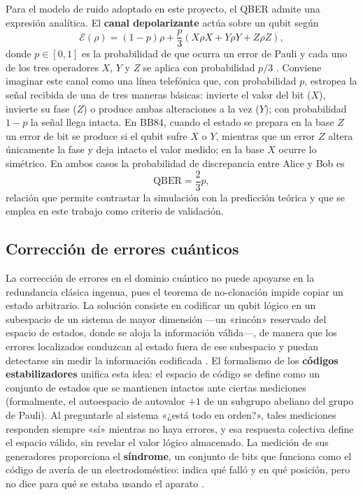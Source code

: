 \documentclass[12pt]{report}
\begin{document}
Para el modelo de ruido adoptado en este proyecto, el QBER admite una expresión
analítica. El \textbf{canal depolarizante} actúa sobre un qubit según
\begin{equation}
\mathcal{E}(\rho) = (1-p)\rho + \frac{p}{3}\left(X\rho X + Y\rho Y + Z\rho Z\right),
\label{eq:canal}
\end{equation}
donde $p \in [0,1]$ es la probabilidad de que ocurra un error de Pauli y cada
uno de los tres operadores $X$, $Y$ y $Z$ se aplica con probabilidad $p/3$
\citep{nielsen2010}. Conviene imaginar este canal como una línea telefónica que,
con probabilidad $p$, estropea la señal recibida de una de tres maneras
básicas: invierte el valor del bit ($X$), invierte su fase ($Z$) o produce ambas
alteraciones a la vez ($Y$); con probabilidad $1-p$ la señal llega intacta. En
BB84, cuando el estado se prepara en la base $Z$ un error de bit se produce si el
qubit sufre $X$ o $Y$, mientras que un error $Z$ altera únicamente la fase y deja
intacto el valor medido; en la base $X$ ocurre lo simétrico. En ambos casos la
probabilidad de discrepancia entre Alice y Bob es
\begin{equation}
\mathrm{QBER} = \frac{2}{3}p,
\label{eq:qber}
\end{equation}
relación que permite contrastar la simulación con la predicción teórica
\citep{gisin2002} y que se emplea en este trabajo como criterio de validación.

\subsection{Corrección de errores cuánticos}

La corrección de errores en el dominio cuántico no puede apoyarse en la
redundancia clásica ingenua, pues el teorema de no-clonación impide copiar un
estado arbitrario. La solución consiste en codificar un qubit lógico en un
subespacio de un sistema de mayor dimensión —un «rincón» reservado del espacio de
estados, donde se aloja la información válida—, de manera que los errores
localizados conduzcan al estado fuera de ese subespacio y puedan detectarse sin
medir la información codificada \citep{nielsen2010, roffe2019}. El formalismo de
los \textbf{códigos estabilizadores} unifica esta idea: el espacio de código se
define como un conjunto de estados que se mantienen intactos ante ciertas
mediciones (formalmente, el autoespacio de autovalor $+1$ de un subgrupo
abeliano del grupo de Pauli). Al preguntarle al sistema «¿está todo en orden?»,
tales mediciones responden siempre «sí» mientras no haya errores, y esa
respuesta colectiva define el espacio válido, sin revelar el valor lógico
almacenado. La medición de sus generadores proporciona el \textbf{síndrome}, un
conjunto de bits que funciona como el código de avería de un electrodoméstico:
indica qué falló y en qué posición, pero no dice para qué se estaba usando el
aparato \citep{gottesman1997}.
\end{document}
